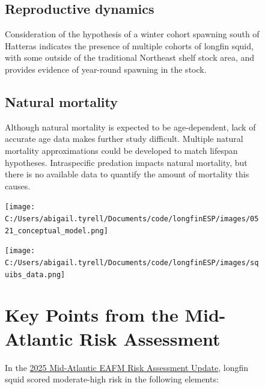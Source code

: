 \documentclass[
  8.5pt,
  letterpaper,
  DIV=11,
  numbers=noendperiod]{scrartcl}
\begin{document}
\begin{figure}
\begin{minipage}{0.57\linewidth}
\vspace{0.25cm}

\subsection{Reproductive dynamics}

Consideration of the hypothesis of a winter cohort spawning south of
Hatteras indicates the presence of multiple cohorts of longfin squid,
with some outside of the traditional Northeast shelf stock area, and
provides evidence of year-round spawning in the stock.

\vspace{0.25cm}

\subsection{Natural mortality}

Although natural mortality is expected to be age-dependent, lack of
accurate age data makes further study difficult. Multiple natural
mortality approximations could be developed to match lifespan
hypotheses. Intraspecific predation impacts natural mortality, but there
is no available data to quantify the amount of mortality this causes.

\vspace{0.25cm}

\texttt{[image: C:/Users/abigail.tyrell/Documents/code/longfinESP/images/0521\_conceptual\_model.png]}

\end{minipage}%
%
\begin{minipage}{0.03\linewidth}

\hfill

\end{minipage}%
%
\begin{minipage}{0.40\linewidth}

\texttt{[image: C:/Users/abigail.tyrell/Documents/code/longfinESP/images/squibs\_data.png]}

\section{Key Points from the Mid-Atlantic Risk Assessment}

\raggedright

In the
\href{https://static1.squarespace.com/static/511cdc7fe4b00307a2628ac6/t/67d45b1680e8654ecaf1b98e/1741970199497/b_Draft+MAB_RiskAssess_2025.pdf}{2025
Mid-Atlantic EAFM Risk Assessment Update}, longfin squid scored
moderate-high risk in the following elements:


\end{minipage}
\end{figure}
\end{document}
